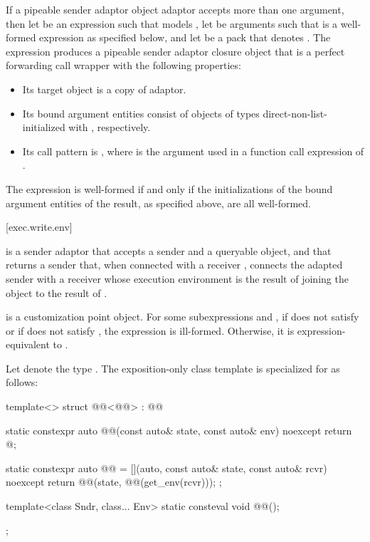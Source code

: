 \pnum
If a pipeable sender adaptor object adaptor accepts more than one argument,
then let  be an expression
such that  models ,
let  be arguments
such that  is a well-formed expression
as specified below, and
let  be a pack that denotes .
The expression  produces
a pipeable sender adaptor closure object 
that is a perfect forwarding call wrapper with the following properties:
\begin{itemize}
\item
Its target object is a copy of adaptor.
\item
Its bound argument entities  consist of
objects of types  direct-non-list-initialized with
, respectively.
\item
Its call pattern is ,
where  is
the argument used in a function call expression of .
\end{itemize}
The expression  is well-formed if and only if
the initializations of the bound argument entities of the result,
as specified above, are all well-formed.

[exec.write.env]{}

\pnum
{} is a sender adaptor
that accepts a sender and a queryable object, and
that returns a sender that,
when connected with a receiver ,
connects the adapted sender with a receiver
whose execution environment is the result of
joining the  object
to the result of .

\pnum
{} is a customization point object.
For some subexpressions  and ,
if  does not satisfy  or
if  does not satisfy ,
the expression  is ill-formed.
Otherwise, it is expression-equivalent to
.

\pnum
Let  denote the type .
The exposition-only class template 
is specialized for  as follows:
\begin{codeblock}
template<>
struct @@<@@> : @@ {
  static constexpr auto @@(const auto& state, const auto& env) noexcept {
    return @\seebelow@;
  }

  static constexpr auto @@ =
    [](auto, const auto& state, const auto& rcvr) noexcept {
      return @@(state, @@(get_env(rcvr)));
    };

  template<class Sndr, class... Env>
    static consteval void @@();
};
\end{codeblock}

